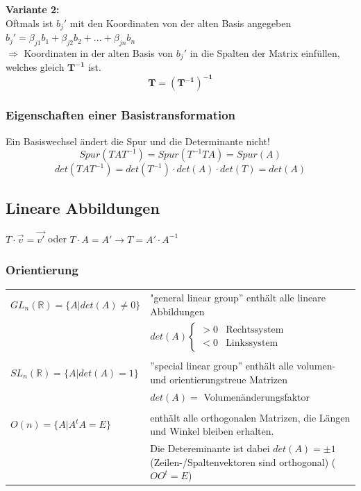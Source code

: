 		\textbf{Variante 2:}\\
		Oftmals ist $b_j'$ mit den Koordinaten von der alten Basis angegeben\\
		$b_j' = \beta_{j1}b_1 + \beta_{j2}b_2 + \ldots + \beta_{jn}b_n$\\
		$\Rightarrow$ Koordinaten in der alten Basis von $b_j'$ in die Spalten der Matrix einfüllen, welches gleich $\mathbf{T^{-1}}$ ist.\\
		\begin{equation*}
			\mathbf{T = (T^{-1})^{-1}}
		\end{equation*}

	\subsubsection{Eigenschaften einer Basistransformation}
		Ein Basiswechsel ändert die Spur und die Determinante nicht!\\
		\begin{equation*}
			Spur(TAT^{-1}) = Spur(T^{-1}TA) = Spur(A)
		\end{equation*}
		\begin{equation*}
			det(TAT^{-1}) = det(T^{-1}) \cdot det(A) \cdot det(T) = det(A)
		\end{equation*}

\subsection{Lineare Abbildungen}
	$ T \cdot \vec{v} = \vec{v'} $
	oder $ T \cdot A = A'  \rightarrow T = A' \cdot A^{-1} $
	\subsubsection{Orientierung}
		\begin{tabular}{lp{13cm}}
			$GL_n(\mathbb{R}) = \lbrace A | det(A) \neq 0\rbrace$ & "general linear group'' enthält alle lineare Abbildungen\\
			& $det(A)\left\lbrace\begin{array}{cc}
				>0 & \text{Rechtssystem}\\
				<0 & \text{Linkssystem}
				\end{array}\right.$ \\ \\

			$SL_n(\mathbb{R}) = \lbrace A | det(A) = 1 \rbrace$ &  ''special linear group'' enthält alle volumen- und orientierungstreue Matrizen\\
			& $det(A) =$ Volumenänderungsfaktor \\ \\

			$O(n) = \lbrace A | A^tA = E \rbrace$ & enthält alle orthogonalen Matrizen, die Längen und Winkel bleiben erhalten.\\
			& Die Detereminante ist dabei $det(A) = \pm1$ (Zeilen-/Spaltenvektoren sind orthogonal) ($OO^t = E$)
		\end{tabular}\\ \\

